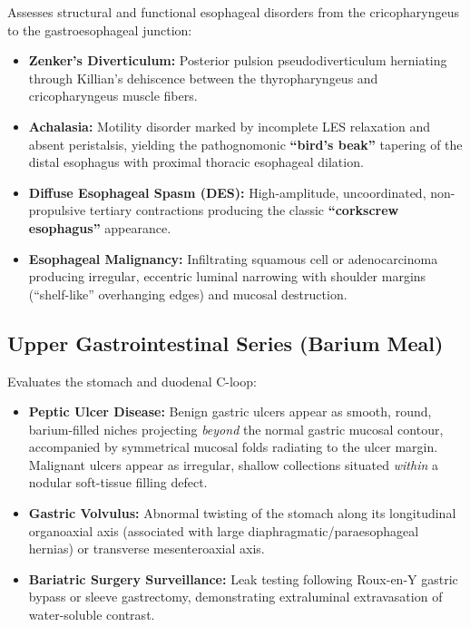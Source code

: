 \documentclass[11pt,a4paper]{article}
\begin{document}
Assesses structural and functional esophageal disorders from the cricopharyngeus to the gastroesophageal junction:
\begin{itemize}[leftmargin=*]
    \item \textbf{Zenker's Diverticulum:} Posterior pulsion pseudodiverticulum herniating through Killian's dehiscence between the thyropharyngeus and cricopharyngeus muscle fibers.
    \item \textbf{Achalasia:} Motility disorder marked by incomplete LES relaxation and absent peristalsis, yielding the pathognomonic \textbf{``bird's beak''} tapering of the distal esophagus with proximal thoracic esophageal dilation.
    \item \textbf{Diffuse Esophageal Spasm (DES):} High-amplitude, uncoordinated, non-propulsive tertiary contractions producing the classic \textbf{``corkscrew esophagus''} appearance.
    \item \textbf{Esophageal Malignancy:} Infiltrating squamous cell or adenocarcinoma producing irregular, eccentric luminal narrowing with shoulder margins (``shelf-like'' overhanging edges) and mucosal destruction.
\end{itemize}

\subsection{Upper Gastrointestinal Series (Barium Meal)}

Evaluates the stomach and duodenal C-loop:
\begin{itemize}[leftmargin=*]
    \item \textbf{Peptic Ulcer Disease:} Benign gastric ulcers appear as smooth, round, barium-filled niches projecting \textit{beyond} the normal gastric mucosal contour, accompanied by symmetrical mucosal folds radiating to the ulcer margin. Malignant ulcers appear as irregular, shallow collections situated \textit{within} a nodular soft-tissue filling defect.
    \item \textbf{Gastric Volvulus:} Abnormal twisting of the stomach along its longitudinal organoaxial axis (associated with large diaphragmatic/paraesophageal hernias) or transverse mesenteroaxial axis.
    \item \textbf{Bariatric Surgery Surveillance:} Leak testing following Roux-en-Y gastric bypass or sleeve gastrectomy, demonstrating extraluminal extravasation of water-soluble contrast.
\end{itemize}
\end{document}
